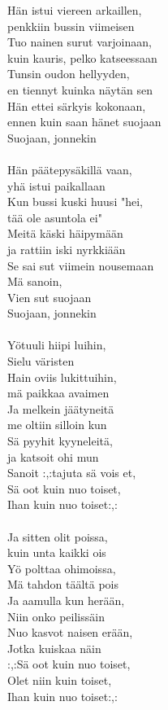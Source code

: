 
Hän istui viereen arkaillen, \\ penkkiin bussin viimeisen \\ Tuo nainen surut varjoinaan, \\ kuin kauris, pelko katseessaan \\ Tunsin oudon hellyyden, \\ en tiennyt kuinka näytän sen \\ Hän ettei särkyis kokonaan, \\ ennen kuin saan hänet suojaan \\ Suojaan, jonnekin \\ \hspace{10mm} \\ Hän päätepysäkillä vaan, \\ yhä istui paikallaan \\ Kun bussi kuski huusi "hei, \\ tää ole asuntola ei" \\ Meitä käski häipymään \\ ja rattiin iski nyrkkiään \\ Se sai sut viimein nousemaan \\ Mä sanoin, \\ Vien sut suojaan \\ Suojaan, jonnekin \\ \hspace{10mm} \\ Yötuuli hiipi luihin, \\ Sielu väristen \\ Hain oviis lukittuihin, \\ mä paikkaa avaimen \\ Ja melkein jäätyneitä \\ me oltiin silloin kun \\ Sä pyyhit kyyneleitä, \\ ja katsoit ohi mun \\ Sanoit :,:tajuta sä vois et, \\ Sä oot kuin nuo toiset, \\ Ihan kuin nuo toiset:,: \\ \hspace{10mm} \\ Ja sitten olit poissa, \\ kuin unta kaikki ois \\ Yö polttaa ohimoissa, \\ Mä tahdon täältä pois \\ Ja aamulla kun herään, \\ Niin onko peilissäin \\ Nuo kasvot naisen erään, \\ Jotka kuiskaa näin \\ :,:Sä oot kuin nuo toiset, \\ Olet niin kuin toiset, \\ Ihan kuin nuo toiset:,: